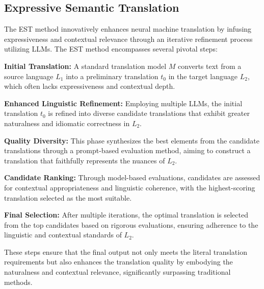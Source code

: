 \subsection{Expressive Semantic Translation}

The EST method innovatively enhances neural machine translation by infusing expressiveness and contextual relevance through an iterative refinement process utilizing LLMs. The EST method encompasses several pivotal steps:

\noindent \textbf{Initial Translation:} A standard translation model \(M\) converts text from a source language \(L_1\) into a preliminary translation \(t_0\) in the target language \(L_2\), which often lacks expressiveness and contextual depth.

\noindent \textbf{Enhanced Linguistic Refinement:} Employing multiple LLMs, the initial translation \(t_0\) is refined into diverse candidate translations that exhibit greater naturalness and idiomatic correctness in \(L_2\).

\noindent \textbf{Quality Diversity:} This phase synthesizes the best elements from the candidate translations through a prompt-based evaluation method, aiming to construct a translation that faithfully represents the nuances of \(L_2\).

\noindent \textbf{Candidate Ranking:} Through model-based evaluations, candidates are assessed for contextual appropriateness and linguistic coherence, with the highest-scoring translation selected as the most suitable.

\noindent \textbf{Final Selection:} After multiple iterations, the optimal translation is selected from the top candidates based on rigorous evaluations, ensuring adherence to the linguistic and contextual standards of \(L_2\).

These steps ensure that the final output not only meets the literal translation requirements but also enhances the translation quality by embodying the naturalness and contextual relevance, significantly surpassing traditional methods.

